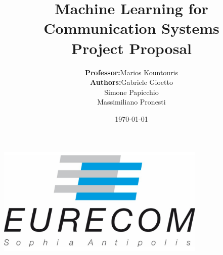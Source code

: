 \title{\Large Machine Learning for Communication Systems \\[0.5cm]
	\bf\Large Project Proposal }

\author{\large 
	\begin{tabular}{rl}
		\textbf{Professor:} & Marios Kountouris \\
		\textbf{Authors:} & Gabriele Gioetto \\ & Simone Papicchio \\ & Massimiliano Pronesti
	\end{tabular}
	}
\date{\large \today}

\makeatletter
\begin{titlepage}
	\begin{center}
		{ \includegraphics[width=10cm]{../eurecom.png}}
		{\ \\ \ \\}
		\vbox{}\vspace{5cm}
		{\@title }\\[3cm] 
		{\@author}\\[3cm]
		{\@date\\}
		
	\end{center}
\end{titlepage}
\makeatother